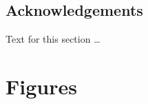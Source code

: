 \documentclass{bmcart}
\begin{document}
\begin{backmatter}
\subsection*{Acknowledgements}
  Text for this section \ldots





\section*{Figures}


\end{backmatter}
\end{document}
